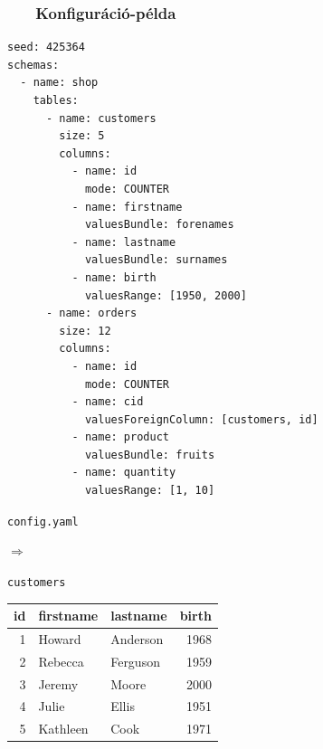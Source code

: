 \documentclass[
    aspectratio=169,
]{beamer}
\newcommand{\slidetitle}[2]{\frametitle{{\small #1 ~ \ding{226} ~ } \normalsize \textbf{#2} }}
\begin{document}
\begin{frame}[fragile]
    \slidetitle{\sectionshorttitle}{Konfiguráció-példa}
    
    \centering
    
    \begin{minipage}[c]{0.47\textwidth}
        \centering
        
        \begin{verbatim}
seed: 425364
schemas:
  - name: shop
    tables:
      - name: customers
        size: 5
        columns:
          - name: id
            mode: COUNTER
          - name: firstname
            valuesBundle: forenames
          - name: lastname
            valuesBundle: surnames
          - name: birth
            valuesRange: [1950, 2000]
      - name: orders
        size: 12
        columns:
          - name: id
            mode: COUNTER
          - name: cid
            valuesForeignColumn: [customers, id]
          - name: product
            valuesBundle: fruits
          - name: quantity
            valuesRange: [1, 10]
        \end{verbatim}
        
        {\footnotesize\texttt{config.yaml}} \pause
    \end{minipage}%
    \hspace*{\fill}
    \begin{minipage}[c]{0.35cm}
        {\Large $\Rightarrow$}
    \end{minipage}%
    \hspace*{\fill}
    \begin{minipage}[c]{0.45\textwidth}
        
        \centering
        
        \normalsize \texttt{customers}
        \vspace{0.1cm}
        
        \tiny
        \begin{tabular}{ |r|l|l|r| }
        \hline
           id & firstname & lastname & birth \\
        \hline
            1 & Howard & Anderson & 1968 \\
            2 & Rebecca & Ferguson & 1959 \\
            3 & Jeremy & Moore & 2000 \\
            4 & Julie & Ellis & 1951 \\
            5 & Kathleen & Cook & 1971 \\
        \hline
        \end{tabular}
        

\end{minipage}
\end{frame}
\end{document}
